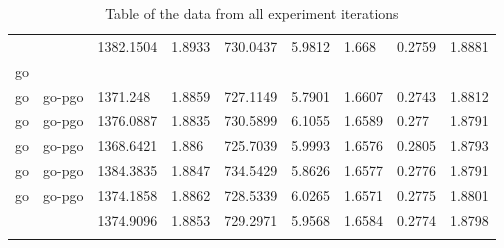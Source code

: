 \begin{longtable}[h]{|lllllllll|}
               &                        & 1382.1504                 & 1.8933                                                               & 730.0437              & 5.9812           & 1.668            & 0.2759       & 1.8881        \\
go             &                        &                           &                                                                      &                       &                  &                  &              &               \\
go             & go-pgo                 & 1371.248                  & 1.8859                                                               & 727.1149              & 5.7901           & 1.6607           & 0.2743       & 1.8812        \\
go             & go-pgo                 & 1376.0887                 & 1.8835                                                               & 730.5899              & 6.1055           & 1.6589           & 0.277        & 1.8791        \\
go             & go-pgo                 & 1368.6421                 & 1.886                                                                & 725.7039              & 5.9993           & 1.6576           & 0.2805       & 1.8793        \\
go             & go-pgo                 & 1384.3835                 & 1.8847                                                               & 734.5429              & 5.8626           & 1.6577           & 0.2776       & 1.8791        \\
go             & go-pgo                 & 1374.1858                 & 1.8862                                                               & 728.5339              & 6.0265           & 1.6571           & 0.2775       & 1.8801        \\
               &                        & 1374.9096                 & 1.8853                                                               & 729.2971              & 5.9568           & 1.6584           & 0.2774       & 1.8798       \\
           \hline
\caption{Table of the data from all experiment iterations}
\label{appendix:experiment-iterations}
\end{longtable}
